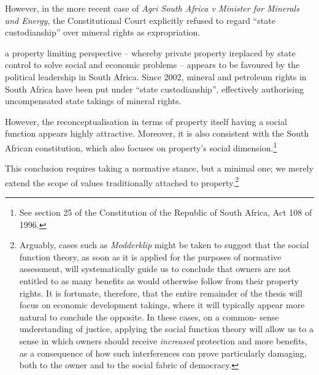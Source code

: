 {However, in the more recent case of {\it Agri South Africa v Minister for Minerals and Energy}, the Constitutional Court explicitly refused to regard ``state custodianship'' over mineral rights as expropriation. 

 a property limiting perspective -- whereby private property ireplaced by state control to solve social and economic problems -- appears to be favoured by the political leadership in South Africa. Since 2002, mineral and petroleum rights in South Africa have been put under ``state custodianship'', effectively authorising uncompensated state takings of mineral rights. 


However, the reconceptualisation in terms of property itself having a social function appears highly attractive. Moreover, it is also consistent with the South African constitution, which also focuses on property's social dimension.\footnote{See section 25 of the Constitution of the Republic of South Africa, Act 108 of 1996.}



This conclusion requires taking a normative stance, but a minimal one; we merely extend the scope of values traditionally attached to property.\footnote{Arguably, cases such as {\it Modderklip} might be taken to suggest that the social function theory, as soon as it is applied for the purposes of normative assessment, will systematically guide us to conclude that owners are not entitled to as many benefits as would otherwise follow from their property rights. It is fortunate, therefore, that the entire remainder of the thesis will focus on economic development takings, where it will typically appear more natural to conclude the opposite. In these cases, on a common- sense understanding of justice, applying the social function theory will allow us to  a sense in which owners should receive {\it increased} protection and more benefits, as a consequence of how such interferences can prove particularly damaging, both to the owner and to the social fabric of democracy.} 

}
